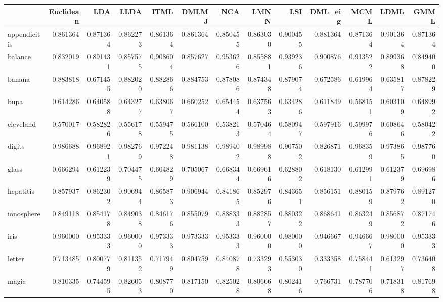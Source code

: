 \begin{tabular}{lrrrrrrrrrrrr}
\toprule
{} &  Euclidean &       LDA &      LLDA &      ITML &     DMLMJ &       NCA &      LMNN &       LSI &   DML\_eig &      MCML &      LDML &      GMML \\
\midrule
appendicitis    &   0.861364 &  0.871364 &  0.862273 &  0.861364 &  0.861364 &  0.850455 &  0.863030 &  0.900455 &  0.881364 &  0.871364 &  0.901364 &  0.871364 \\
balance         &   0.832019 &  0.891431 &  0.857575 &  0.908604 &  0.857627 &  0.953626 &  0.855881 &  0.939236 &  0.900876 &  0.913522 &  0.899368 &  0.849400 \\
banana          &   0.883818 &  0.671455 &  0.882020 &  0.882866 &  0.884753 &  0.878086 &  0.874348 &  0.879074 &  0.672586 &  0.619964 &  0.635817 &  0.878229 \\
bupa            &   0.614286 &  0.640588 &  0.643277 &  0.638067 &  0.660252 &  0.654454 &  0.637563 &  0.634286 &  0.611849 &  0.568151 &  0.603109 &  0.648992 \\
cleveland       &   0.570017 &  0.582826 &  0.556178 &  0.559475 &  0.566100 &  0.538213 &  0.570464 &  0.580947 &  0.597916 &  0.599976 &  0.608646 &  0.580422 \\
digits          &   0.986688 &  0.968921 &  0.982769 &  0.972248 &  0.981138 &  0.989402 &  0.989988 &  0.907502 &  0.826871 &  0.968359 &  0.973865 &  0.987760 \\
glass           &   0.666294 &  0.612239 &  0.704475 &  0.604829 &  0.705067 &  0.668344 &  0.669616 &  0.628802 &  0.618130 &  0.612991 &  0.612379 &  0.696986 \\
hepatitis       &   0.857937 &  0.862302 &  0.906944 &  0.865873 &  0.906944 &  0.841865 &  0.852976 &  0.843651 &  0.856151 &  0.880159 &  0.879762 &  0.891270 \\
ionosphere      &   0.849118 &  0.854178 &  0.849038 &  0.846176 &  0.855079 &  0.888333 &  0.882857 &  0.880322 &  0.868641 &  0.863249 &  0.856872 &  0.871746 \\
iris            &   0.960000 &  0.953333 &  0.960000 &  0.973333 &  0.973333 &  0.953333 &  0.960000 &  0.980000 &  0.946667 &  0.946667 &  0.980000 &  0.953333 \\
letter          &   0.713485 &  0.800779 &  0.811352 &  0.717949 &  0.804759 &  0.840878 &  0.733293 &  0.553030 &  0.333358 &  0.758441 &  0.613297 &  0.736408 \\
magic           &   0.810335 &  0.744595 &  0.826053 &  0.808770 &  0.817150 &  0.825028 &  0.806668 &  0.802416 &  0.766731 &  0.787706 &  0.718318 &  0.817698 \\

\end{tabular}
